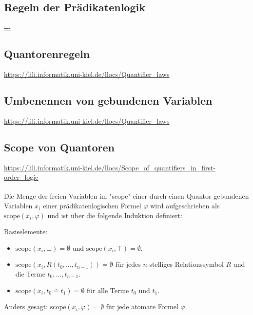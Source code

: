 \documentclass[twocolumn]{article}
\begin{document}
    \subsection{Regeln der Prädikatenlogik}
    \url{---}\\

    \subsection{Quantorenregeln}
    \url{https://lili.informatik.uni-kiel.de/llocs/Quantifier_laws}\\

    \subsection{Umbenennen von gebundenen Variablen}
    \url{https://lili.informatik.uni-kiel.de/llocs/Quantifier_laws}\\
    

    \subsection{Scope von Quantoren}
    \url{https://lili.informatik.uni-kiel.de/llocs/Scope_of_quantifiers_in_first-order_logic}\\\\
    Die Menge der freien Variablen im "scope" einer durch einen Quantor gebundenen Variablen $x_i$ einer prädikatenlogischen Formel $\varphi$ wird aufgeschrieben als $\text{scope}(x_i, \varphi)$ und ist über die folgende Induktion definiert:

    Basiselemente:
    \begin{itemize}
        \item $\text{scope}(x_i, \bot) = \emptyset$ und $\text{scope}(x_i, \top) = \emptyset$.
        \item $\text{scope}(x_i, R(t_0, \dots, t_{n-1})) = \emptyset$ für jedes $n$-stelliges Relationssymbol $R$ und die Terme $t_0, \dots, t_{n-1}$.
        \item $\text{scope}(x_i, t_0 \doteq t_1) = \emptyset$ für alle Terme $t_0$ und $t_1$.
    \end{itemize}
    Anders gesagt: $\text{scope}(x_i, \varphi) = \emptyset$ für jede atomare Formel $\varphi$.\\
\end{document}
